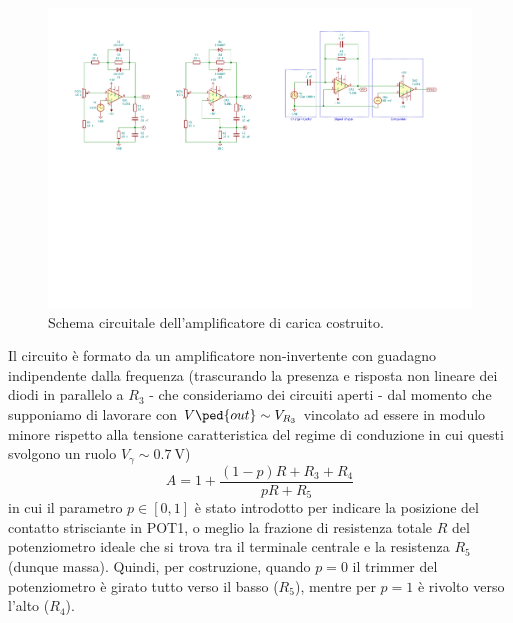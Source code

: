 \documentclass[10pt, a4paper, italian]{article}
\begin{document}
\begin{figure}[htbp]
    \centering
	\includegraphics[scale=1.2]{aloopschm}
    \caption{Schema circuitale dell'amplificatore di carica costruito.
    \label{fig: aloopschm}}
\end{figure}

Il circuito è formato da un amplificatore non-invertente con guadagno
indipendente dalla frequenza (trascurando la presenza e risposta non lineare
dei diodi in parallelo a $R_3$ - che consideriamo dei circuiti aperti - dal
momento che supponiamo di lavorare con $V\ped{out} \sim V_{R_3}$ vincolato ad
essere in modulo minore rispetto alla tensione caratteristica del regime di
conduzione in cui questi svolgono un ruolo $V_\gamma \sim \SI{0.7}{\V}$)
\begin{equation}\label{eq: A}
A  = 1 + \frac{(1 - p)R + R_3 + R_4}{pR + R_5}
\end{equation}
in cui il parametro $p \in [0,1]$ è stato introdotto per indicare la posizione
del contatto strisciante in POT1, o meglio la frazione di resistenza
totale $R$ del potenziometro ideale che si trova tra il terminale centrale e
la resistenza $R_5$ (dunque massa). Quindi, per costruzione, quando $p = 0$
il trimmer del potenziometro è girato tutto verso il basso ($R_5$), mentre per
$p = 1$ è rivolto verso l'alto ($R_4$).
\end{document}
